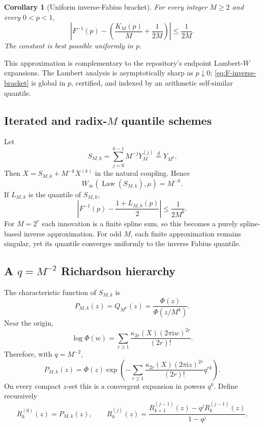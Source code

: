 \documentclass[11pt,oneside]{article}
\newtheorem{corollary}[theorem]{Corollary}
\theoremstyle{definition}
\theoremstyle{remark}
\newcommand{\ii}{\mathrm i}
\numberwithin{equation}{section}
\newcommand{\Law}{\operatorname{Law}}
\newcommand{\1}{\mathbf 1}
\begin{document}
\begin{corollary}[Uniform inverse-Fabius bracket]
\label{cor:inverse-bracket}
For every integer $M\ge2$ and every $0<p<1$,
\begin{equation}
 \boxed{
 \left|F^{-1}(p)-\left(\frac{K_M(p)}{M}+\frac1{2M}\right)\right|
 \le\frac1{2M}.}
 \label{eq:F-inverse-bracket}
\end{equation}
The constant is best possible uniformly in $p$.
\end{corollary}

This approximation is complementary to the repository's endpoint Lambert-$W$ expansions.
The Lambert analysis is asymptotically sharp as $p\downarrow0$; \eqref{eq:F-inverse-bracket}
is global in $p$, certified, and indexed by an arithmetic self-similar quantile.

\subsection{Iterated and radix-$M$ quantile schemes}

Let
\begin{equation}
 S_{M,k}=\sum_{j=0}^{k-1}M^{-j}Y_M^{(j)}\overset d=Y_{M^k}.
 \label{eq:SMk}
\end{equation}
Then $X=S_{M,k}+M^{-k}X^{(k)}$ in the natural coupling.  Hence
\begin{equation}
 W_\infty(\Law(S_{M,k}),\mu)=M^{-k}.
 \label{eq:iter-W}
\end{equation}
If $L_{M,k}$ is the quantile of $S_{M,k}$,
\begin{equation}
 \left|F^{-1}(p)-\frac{1+L_{M,k}(p)}2\right|
 \le\frac1{2M^k}.
 \label{eq:iter-inverse}
\end{equation}
For $M=2^r$ each innovation is a finite spline sum, so this becomes a purely spline-based
inverse approximation.  For odd $M$, each finite approximation remains singular, yet its
quantile converges uniformly to the inverse Fabius quantile.

\subsection{A $q=M^{-2}$ Richardson hierarchy}

The characteristic function of $S_{M,k}$ is
\begin{equation}
 P_{M,k}(z)=Q_{M^k}(z)=\frac{\Phi(z)}{\Phi(z/M^k)}.
 \label{eq:PMk}
\end{equation}
Near the origin,
\begin{equation}
 \log\Phi(w)=\sum_{r\ge1}
 \frac{\kappa_{2r}(X)(2\pi\ii w)^{2r}}{(2r)!}.
 \label{eq:logPhi-cumulant}
\end{equation}
Therefore, with $q=M^{-2}$,
\begin{equation}
 P_{M,k}(z)=\Phi(z)
 \exp\!\left(-\sum_{r\ge1}
 \frac{\kappa_{2r}(X)(2\pi\ii z)^{2r}}{(2r)!}q^{rk}\right).
 \label{eq:PMk-q-expansion}
\end{equation}
On every compact $z$-set this is a convergent expansion in powers $q^k$.  Define recursively
\begin{equation}
 R_k^{(0)}(z)=P_{M,k}(z),
 \qquad
 R_k^{(j)}(z)=
 \frac{R_{k+1}^{(j-1)}(z)-q^jR_k^{(j-1)}(z)}{1-q^j}.
 \label{eq:q-Richardson}
\end{equation}
\end{document}
